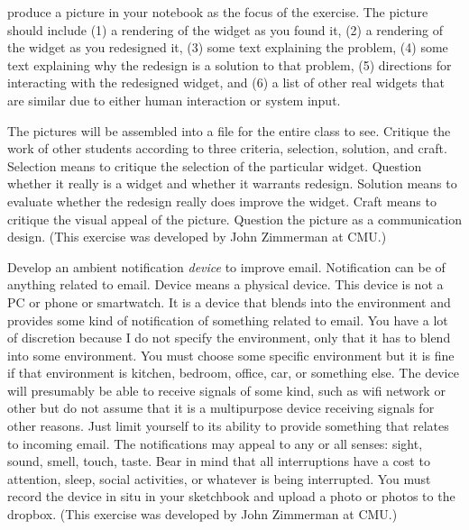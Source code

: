 produce a picture in your notebook as the focus of the exercise. The
picture should include (1) a rendering of the widget as you found it,
(2) a rendering of the widget as you redesigned it, (3) some text
explaining the problem, (4) some text explaining why the redesign is a
solution to that problem, (5) directions for interacting with the
redesigned widget, and (6) a list of other real widgets that are similar
due to either human interaction or system input.

The pictures will be assembled into a file for the entire class to see.
Critique the work of other students according to three criteria,
selection, solution, and craft. Selection means to critique the
selection of the particular widget. Question whether it really is a
widget and whether it warrants redesign. Solution means to evaluate
whether the redesign really does improve the widget. Craft means to
critique the visual appeal of the picture. Question the picture as a
communication design. (This exercise was developed by John Zimmerman at
CMU.)

\hypertarget{ambient-notification}{%
\label{ambient-notification}}

Develop an ambient notification \emph{device} to improve email.
Notification can be of anything related to email. Device means a
physical device. This device is not a PC or phone or smartwatch. It is a
device that blends into the environment and provides some kind of
notification of something related to email. You have a lot of discretion
because I do not specify the environment, only that it has to blend into
some environment. You must choose some specific environment but it is
fine if that environment is kitchen, bedroom, office, car, or something
else. The device will presumably be able to receive signals of some
kind, such as wifi network or other but do not assume that it is a
multipurpose device receiving signals for other reasons. Just limit
yourself to its ability to provide something that relates to incoming
email. The notifications may appeal to any or all senses: sight, sound,
smell, touch, taste. Bear in mind that all interruptions have a cost to
attention, sleep, social activities, or whatever is being interrupted.
You must record the device in situ in your sketchbook and upload a photo
or photos to the dropbox. (This exercise was developed by John Zimmerman
at CMU.)

\hypertarget{thousand-floor-elevator}{%
\label{thousand-floor-elevator}}

